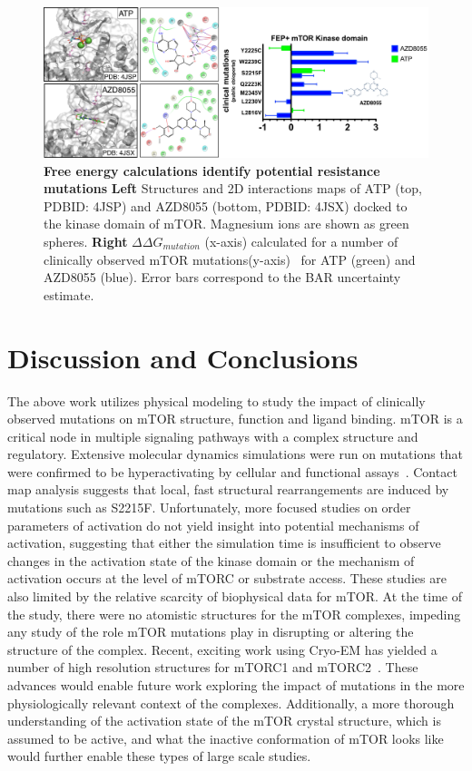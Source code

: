 \documentclass[phd,tocprelim]{cornell}
\begin{document}
\begin{landscape}
	\begin{figure}[p]
		\centering
		\includegraphics[width=1.0\linewidth]{figures/mtor-fig7.pdf}
		\caption[Free energy calculations identify potential resistance mutations]{
			{\bf Free energy calculations identify potential resistance mutations}
			{\bf Left} Structures and 2D interactions maps of ATP (top, PDBID: 4JSP) and AZD8055 (bottom, PDBID: 4JSX) docked to the kinase domain of mTOR. Magnesium ions are shown as green spheres.  {\bf Right} $\Delta \Delta G_{mutation}$ (x-axis) calculated for a number of clinically observed mTOR mutations(y-axis)~\citep{Zehir:Nat.Med.:2017} for ATP (green) and AZD8055 (blue). Error bars correspond to the BAR uncertainty estimate. 
		}
		\label{fig:mtor-figure7}
	\end{figure}
\end{landscape}


\section{Discussion and Conclusions}
The above work utilizes physical modeling to study the impact of clinically observed mutations on mTOR structure, function and ligand binding. mTOR is a critical node in multiple signaling pathways with a complex structure and regulatory.  Extensive molecular dynamics simulations were run on mutations that were confirmed to be hyperactivating by cellular and functional assays~\citep{Xu:2016fw}. Contact map analysis suggests that local, fast structural rearrangements are induced by mutations such as S2215F. Unfortunately, more focused studies on order parameters of activation do not yield insight into potential mechanisms of activation, suggesting that either the simulation time is insufficient to observe changes in the activation state of the kinase domain or the mechanism of activation occurs at the level of mTORC or substrate access. These studies are also limited by the relative scarcity of biophysical data for mTOR. At the time of the study, there were no atomistic structures for the mTOR complexes, impeding any study of the role mTOR mutations play in disrupting or altering the structure of the complex. Recent, exciting work using Cryo-EM has yielded a number of high resolution structures for mTORC1 and mTORC2~\citep{Yang:2017gu,Stuttfeld:2018kg,Yuan:2016ef,Yang:2016kk}. These advances would enable future work exploring the impact of mutations in the more physiologically relevant context of the complexes. Additionally, a more thorough understanding of the activation state of the mTOR crystal structure, which is assumed to be active, and what the inactive conformation of mTOR looks like would further enable these types of large scale studies. 
\end{document}
